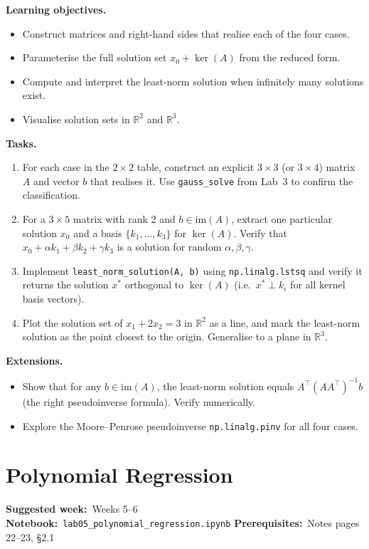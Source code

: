 \documentclass[11pt, a4paper]{article}
\newcommand{\labmeta}[3]{%
  \begin{prereqbox}
  \textbf{Suggested week:}~#1 \quad
  \textbf{Notebook:}~\texttt{#2} \quad
  \textbf{Prerequisites:}~#3
  \end{prereqbox}
  \vspace{4pt}
}
\newcommand{\objectives}[1]{%
  \textbf{\color{prereqcolor}Learning objectives.}\vspace{2pt}
  \begin{itemize}[leftmargin=1.6em, itemsep=1pt] #1 \end{itemize}
}
\newcommand{\tasks}[1]{%
  \begin{taskbox}
  \textbf{\color{taskcolor}Tasks.}
  \begin{enumerate}[leftmargin=1.6em, itemsep=3pt] #1 \end{enumerate}
  \end{taskbox}
}
\newcommand{\extensions}[1]{%
  \textbf{\color{notecolor}Extensions.}
  \begin{itemize}[leftmargin=1.6em, itemsep=1pt] #1 \end{itemize}
}
\begin{document}
\objectives{
  \item Construct matrices and right-hand sides that realise each of the four cases.
  \item Parameterise the full solution set $x_0 + \ker(A)$ from the reduced form.
  \item Compute and interpret the least-norm solution when infinitely many solutions exist.
  \item Visualise solution sets in $\mathbb{R}^2$ and $\mathbb{R}^3$.
}

\tasks{
  \item For each case in the $2\times 2$ table, construct an explicit $3\times 3$
        (or $3\times 4$) matrix $A$ and vector $b$ that realises it.
        Use \texttt{gauss\_solve} from Lab~3 to confirm the classification.
  \item For a $3\times 5$ matrix with rank 2 and $b \in \mathrm{im}(A)$,
        extract one particular solution $x_0$ and a basis $\{k_1,\ldots,k_3\}$
        for $\ker(A)$.  Verify that $x_0 + \alpha k_1 + \beta k_2 + \gamma k_3$
        is a solution for random $\alpha, \beta, \gamma$.
  \item Implement \texttt{least\_norm\_solution(A, b)} using
        \texttt{np.linalg.lstsq} and verify it returns the solution $x^*$
        orthogonal to $\ker(A)$ (i.e.\ $x^* \perp k_i$ for all kernel basis vectors).
  \item Plot the solution set of $x_1 + 2x_2 = 3$ in $\mathbb{R}^2$ as a line,
        and mark the least-norm solution as the point closest to the origin.
        Generalise to a plane in $\mathbb{R}^3$.
}

\extensions{
  \item Show that for any $b \in \mathrm{im}(A)$, the least-norm solution equals
        $A^\top(AA^\top)^{-1}b$ (the right pseudoinverse formula).
        Verify numerically.
  \item Explore the Moore--Penrose pseudoinverse \texttt{np.linalg.pinv} for all four cases.
}

\section{Polynomial Regression}
\label{lab:regression}

\labmeta{Weeks 5--6}{lab05\_polynomial\_regression.ipynb}{Notes pages 22--23, §2.1}

\vspace{4pt}
\end{document}
